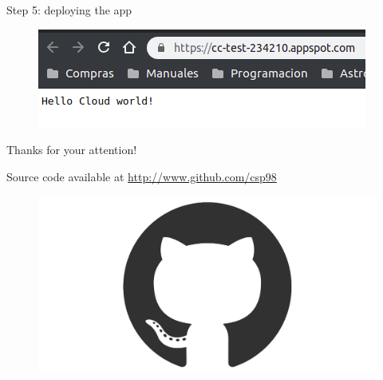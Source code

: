 \documentclass{beamer}
\begin{document}
\begin{frame}[fragile]{Step 5: deploying the app}
    \begin{figure}[H]
      \centering
      \includegraphics[scale=0.75]{img/tutorial/9browse}
    \end{figure}
\end{frame}


\begin{frame}[fragile]
 \begin{center}
  \Huge
  Thanks for your attention!
 \end{center}
 \vspace{2cm}
 Source code available at \textcolor{blue}{\url{http://www.github.com/csp98}}
 \vspace{1cm}
 \begin{figure}[H]
  \centering
  \includegraphics[scale=0.05]{github-mark.png}
 \end{figure}

\end{frame}
\end{document}
